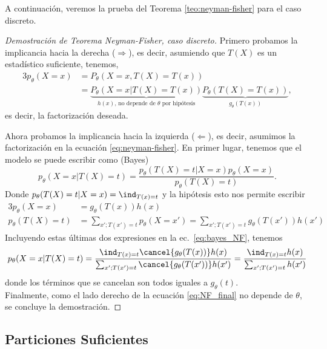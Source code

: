 A continuación, veremos la prueba del Teorema \ref{teo:neyman-fisher} para el caso discreto. 


\begin{proof}[Demostración de Teorema Neyman-Fisher, caso discreto]
Primero probamos la implicancia hacia la derecha ($\Rightarrow$), es decir, asumiendo que $T(X)$ es un estadístico suficiente, tenemos,
	\begin{alignat*}{3}
		p_\theta(X=x) 	&= P_\theta(X=x, T(X)=T(x))\\
						&= \underbrace{P_\theta(X=x| T(X)=T(x))}_{h(x)\text{, no depende de $\theta$ por hipótesis}} \underbrace{P_\theta(T(X)=T(x))}_{g_\theta(T(x))},
	\end{alignat*}
	es decir, la factorización deseada.

	Ahora probamos la implicancia hacia la izquierda ($\Leftarrow$), es decir, asumimos la factorización en la ecuación \eqref{eq:neyman-fisher}. En primer lugar, tenemos que el modelo se puede escribir como (Bayes)
	\begin{equation*}
		\label{eq:bayes_NF}
		p_\theta(X=x|T(X)=t)=  \frac{p_\theta(T(X)=t|X=x)p_\theta(X=x)}{p_\theta(T(X)=t)}.
	\end{equation*}
	Donde $p_\theta(T(X)=t|X=x)= \ind_{T(x)=t}$ y la hipótesis esto nos permite escribir 
	\begin{alignat*}{3}
		p_\theta(X=x)&=  g_\theta(T(x))h(x)\\
		p_\theta(T(X)=t) &= \sum_{x';T(x')=t}p_\theta(X=x') = \sum_{x';T(x')=t}g_\theta(T(x'))h(x')
	\end{alignat*}
	Incluyendo estas últimas dos expresiones en la ec.~\eqref{eq:bayes_NF}, tenemos 
	\begin{equation}
		\label{eq:NF_final}
		p_\theta(X=x|T(X)=t)=  \frac{\ind_{T(x)=t}\cancel{g_\theta(T(x))}h(x)}{\sum_{x';T(x')=t}\cancel{g_\theta(T(x'))}h(x')}=  \frac{\ind_{T(x)=t}h(x)}{\sum_{x';T(x')=t}h(x')}
	\end{equation}
	donde los términos que se cancelan son todos iguales a $g_\theta(t)$.\\

	Finalmente, como el lado derecho de la ecuación \eqref{eq:NF_final} no depende de $\theta$, se concluye la demostración.
\end{proof}

\subsection{Particiones Suficientes}

